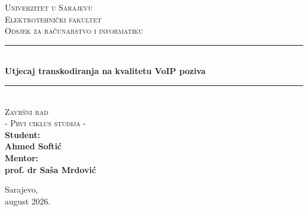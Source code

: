 \documentclass[12pt,oneside, a4paper]{book}
\newcommand{\HRule}{\rule{\linewidth}{0.5mm}}
\begin{document}
\hypersetup{pageanchor=false}

\frontmatter

\begin{titlepage}
\begin{center}

\textsc{\Large Univerzitet u Sarajevu}\\[0.2cm]  
\textsc{\Large Elektrotehnički fakultet}\\[0.2cm] 
\textsc{\Large Odsjek za računarstvo i informatiku}\\[3cm]\HRule \\[0.5cm] 
{\huge \bfseries Utjecaj transkodiranja na kvalitetu VoIP poziva} \\[0.4cm] 
\HRule \\[0.5cm]

\textsc{\Large Završni rad}\\[0.4cm]
\textsc{\Large - Prvi ciklus studija - }\\[1.5cm]

\textbf{ 
\Large Student:\\  
\Large Ahmed Softić\\[1cm]  
\Large Mentor: \\[0.2cm] 
\Large prof. dr Saša Mrdović} 
\vfill

{\large Sarajevo, \\august 2026.}

\end{center} 
\end{titlepage}
\hypersetup{pageanchor=true}









\tableofcontents

\listoffigures
{}
\end{document}
